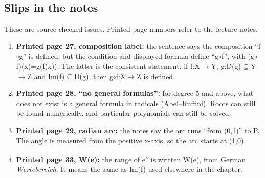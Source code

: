 \documentclass[11pt]{article}
\begin{document}
\begin{keepsection}
\begin{keepsection}
\end{keepsection}
\end{keepsection}

\begin{keepsection}
\section{Slips in the notes}

These are source-checked issues. Printed page numbers refer to the lecture notes.

\begin{enumerate}
\item \textbf{Printed page 27, composition label:} the sentence says the composition “f\ensuremath{\circ}g” is defined, but the condition and displayed formula define “g\ensuremath{\circ}f”, with (g\ensuremath{\circ}f)(x)=g(f(x)). The latter is the consistent statement: if f:X\ensuremath{\to}Y, g:D(g)\ensuremath{\subseteq}Y\ensuremath{\to}Z and Im(f)\ensuremath{\subseteq}D(g), then g\ensuremath{\circ}f:X\ensuremath{\to}Z is defined.
\item \textbf{Printed page 28, “no general formulas”:} for degree 5 and above, what does not exist is a general formula in radicals (Abel–Ruffini). Roots can still be found numerically, and particular polynomials can still be solved.
\item \textbf{Printed page 29, radian arc:} the notes say the arc runs “from (0,1)” to P. The angle is measured from the positive x-axis, so the arc starts at (1,0).
\item \textbf{Printed page 33, W(e):} the range of e\textsuperscript{x} is written W(e), from German \emph{Wertebereich}. It means the same as Im(f) used elsewhere in the chapter.
\end{enumerate}
\end{keepsection}
\end{document}
